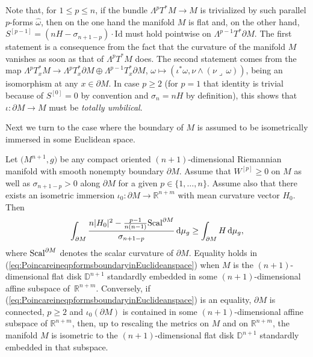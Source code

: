 \begin{Remark}\label{r:LambdapTMtrivial} Note that, for $1\leq p\leq n$, if the bundle $\Lambda^p T^*M\to M$ is trivialized by such parallel $p$-forms $\hat{\omega}$, then on the one hand the manifold $M$ is flat and, on the other hand, $S^{[p-1]}=(nH-\sigma_{n+1-p})\cdot\mathrm{Id}$ must hold pointwise on $\Lambda^{p-1}T^*\partial M$.
The first statement is a consequence from the fact that the curvature of the manifold $M$ vanishes as soon as that of $\Lambda^p T^*M$ does.
The second statement comes from the map $\Lambda^p T_x^*M\to \Lambda^p T^*_x\partial M\oplus \Lambda^{p-1} T^*_x\partial M$, $\omega\mapsto (\iota^*\omega,\nu\wedge(\nu\lrcorner\,\omega))$, being an isomorphism at any $x\in \partial M$.  In case $p\geq2$ (for $p=1$ that identity is trivial because of $S^{[0]}=0$ by convention and $\sigma_{n}=nH$ by definition), this shows that $\iota\colon\partial M\to M$ must be \emph{totally umbilical}.
\end{Remark}

Next we turn to the case where the boundary of $M$ is assumed to be isometrically immersed in some Euclidean space.

\begin{Theorem}\label{t:PoincareineqpformsboundaryinEuclideanspace}
Let $\bigl(M^{n+1},g\bigr)$ be any compact oriented $(n+1)$-dimensional Riemannian manifold with smooth nonempty boundary $\partial M$.
Assume that $W^{[p]}\geq0$ on $M$ as well as $\sigma_{n+1-p}>0$ along $\partial M$ for a given $p\in\{1,\dots,n\}$.
Assume also that there exists an isometric immersion $\iota_0\colon\partial M\to\mathbb{R}^{n+m}$ with mean curvature vector $H_0$. Then
\begin{equation}\label{eq:PoincareineqpformsboundaryinEuclideanspace}
\int_{\partial M}\frac{n|H_0|^2-\frac{p-1}{n(n-1)}{\rm Scal}^{\partial M}}{\sigma_{n+1-p}}\,{\rm d}\mu_g\geq\int_{\partial M}H\,{\rm d}\mu_g,
\end{equation}
where  ${\rm Scal}^{\partial M}$  denotes the scalar curvature of $\partial M$. Equality holds in {\rm (\ref{eq:PoincareineqpformsboundaryinEuclideanspace})} when $M$ is the $(n+1)$-dimensional flat disk $\mathbb{D}^{n+1}$ standardly embedded in some $(n+1)$-dimensional affine subspace of~$\mathbb{R}^{n+m}$. Conversely, if {\rm (\ref{eq:PoincareineqpformsboundaryinEuclideanspace})} is an equality, $\partial M$ is connected, $p\geq 2$ and $\iota_0(\partial M)$ is contained in some $(n+1)$-dimensional affine subspace of $\mathbb{R}^{n+m}$, then, up to rescaling the metrics on $M$ and on $\mathbb{R}^{n+m}$, the manifold $M$ is isometric to the $(n+1)$-dimensional flat disk $\mathbb{D}^{n+1}$ standardly embedded in that subspace.
\end{Theorem}


